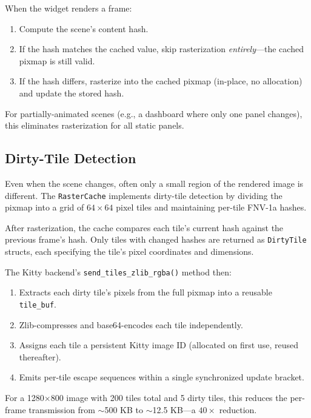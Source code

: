\documentclass[11pt, a4paper, twocolumn]{article}
\begin{document}
When the widget renders a frame:
\begin{enumerate}[leftmargin=1.5em, itemsep=0.1em]
    \item Compute the scene's content hash.
    \item If the hash matches the cached value, skip rasterization \emph{entirely}---the cached pixmap is still valid.
    \item If the hash differs, rasterize into the cached pixmap (in-place, no allocation) and update the stored hash.
\end{enumerate}

For partially-animated scenes (e.g., a dashboard where only one panel changes), this eliminates rasterization for all static panels.

\subsection{Dirty-Tile Detection}

Even when the scene changes, often only a small region of the rendered image is different.
The \texttt{RasterCache} implements dirty-tile detection by dividing the pixmap into a grid of $64 \times 64$ pixel tiles and maintaining per-tile FNV-1a hashes.

After rasterization, the cache compares each tile's current hash against the previous frame's hash.
Only tiles with changed hashes are returned as \texttt{DirtyTile} structs, each specifying the tile's pixel coordinates and dimensions.

The Kitty backend's \texttt{send\_tiles\_zlib\_rgba()} method then:
\begin{enumerate}[leftmargin=1.5em, itemsep=0.1em]
    \item Extracts each dirty tile's pixels from the full pixmap into a reusable \texttt{tile\_buf}.
    \item Zlib-compresses and base64-encodes each tile independently.
    \item Assigns each tile a persistent Kitty image ID (allocated on first use, reused thereafter).
    \item Emits per-tile escape sequences within a single synchronized update bracket.
\end{enumerate}

For a 1280$\times$800 image with 200 tiles total and 5 dirty tiles, this reduces the per-frame transmission from $\sim$500 KB to $\sim$12.5 KB---a $40\times$ reduction.

\end{document}
